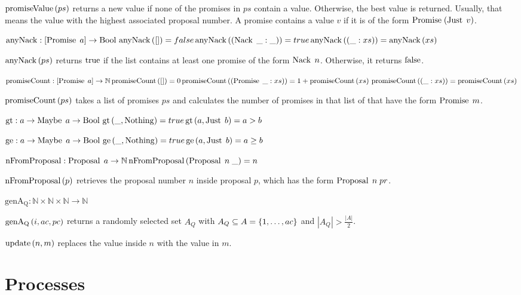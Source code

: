 $\operatorname{promiseValue}\left(ps\right)$ returns a new value if none of the promises in $ps$ contain a value. Otherwise, the best value is returned. Usually, that means the value with the highest associated proposal number.
A promise contains a value $v$ if it is of the form $\operatorname{Promise}\; (\operatorname{Just}\; v)$.

$\operatorname{anyNack} : [\operatorname{Promise}\; a] \to \operatorname{Bool}\\
\operatorname{anyNack}\left([]\right) = false\\
\operatorname{anyNack}\left(\left(\operatorname{Nack}\; \_: \_\right)\right) = true\\
\operatorname{anyNack}\left(\left(\_:xs\right)\right) = \operatorname{anyNack}\left(xs\right)$

$\operatorname{anyNack}\left(ps\right)$ returns $\operatorname{true}$ if the list contains at least one promise of the form $\operatorname{Nack}\; n$.
Otherwise, it returns $\operatorname{false}$.

$\operatorname{promiseCount} : [\operatorname{Promise}\; a] \to \mathbb{N}\\
\operatorname{promiseCount}\left([]\right) = 0\\
\operatorname{promiseCount}\left(\left(\operatorname{Promise}\; \_:xs\right)\right) = 1 + \operatorname{promiseCount}\left(xs\right)\\
\operatorname{promiseCount}\left(\left(\_:xs\right)\right) = \operatorname{promiseCount}\left(xs\right)$

$\operatorname{promiseCount}\left(ps\right)$ takes a list of promises $ps$ and calculates the number of promises in that list of that have the form $\operatorname{Promise}\; m$.

$\operatorname{gt}: a \to \operatorname{Maybe}\; a \to \operatorname{Bool}\\
\operatorname{gt}\left(\_, \operatorname{Nothing}\right) = true\\
\operatorname{gt}\left(a, \operatorname{Just}\; b\right) = a > b$

$\operatorname{ge}: a \to \operatorname{Maybe}\; a \to \operatorname{Bool}\\
\operatorname{ge}\left(\_, \operatorname{Nothing}\right) = true\\
\operatorname{ge}\left(a, \operatorname{Just}\; b\right) = a \ge b$

$\operatorname{nFromProposal} : \operatorname{Proposal}\; a \to \mathbb{N}\\
\operatorname{nFromProposal}\left(\operatorname{Proposal}\; n\; \_ \right) = n$

$\operatorname{nFromProposal}\left(p \right)$ retrieves the proposal number $n$ inside proposal $p$, which has the form $\operatorname{Proposal}\; n\; pr$.

$\operatorname{genA_Q} : \mathbb{N} \times \mathbb{N} \times \mathbb{N} \to \mathbb{N}$

$\operatorname{genA_Q}\left(i, ac, pc\right)$ returns a randomly selected set $A_Q$ with $A_Q \subseteq A = \left\{1, \dots, ac\right\}$ and $|A_Q| > \frac{|A|}{2}$.

$\operatorname{update} \left(n, m\right)$ replaces the value inside $n$ with the value in $m$.

\section{Processes}
\newcommand{\Sys}[2]{\operatorname{Sys}\left(#1, #2\right)}
\newcommand{\Pa}[0]{\operatorname{P^a}}
\newcommand{\Pp}[0]{\operatorname{P^p}}
\newcommand{\PaCont}[0]{\operatorname{P^a_{cont}}}

